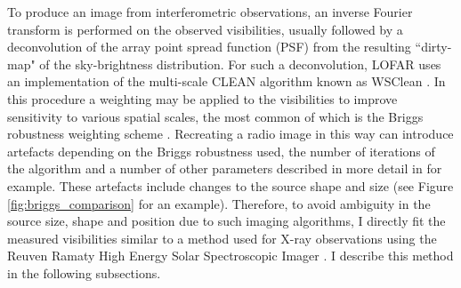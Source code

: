 To produce an image from interferometric observations, an inverse Fourier transform is performed on the observed visibilities, usually followed by a deconvolution of the array point spread function (PSF) from the resulting ``dirty-map" of the sky-brightness distribution.
For such a deconvolution, LOFAR uses an implementation of the multi-scale CLEAN algorithm known as WSClean \citep{Offringa2014}. In this procedure a weighting may be applied to the visibilities to improve sensitivity to various spatial scales, the most common of which is the Briggs robustness weighting scheme \citep{Briggs1995}. Recreating a radio image in this way can introduce artefacts depending on the Briggs robustness used, the number of iterations of the algorithm and a number of other parameters described in more detail in \cite{Hogbom1974, Cornwell2008, Offringa2014, Offringa2017} for example. These artefacts include changes to the source shape and size (see Figure \ref{fig:briggs_comparison} for an example). Therefore, to avoid ambiguity in the source size, shape and position due to such imaging algorithms, I directly fit the measured visibilities similar to a method used for X-ray observations using the Reuven Ramaty High Energy Solar Spectroscopic Imager \citep[RHESSI][]{Hurford2002, Kontar2010}. I describe this method in the following subsections. 

